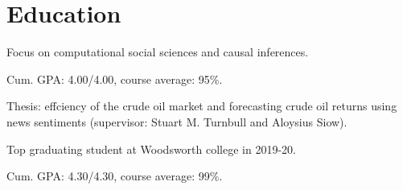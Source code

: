 \documentclass[letterpaper]{deedy-resume} %
\begin{document}
\begin{minipage}[t]{0.66\textwidth} %


\section{Education}


\vspace{\topsep} %
\begin{tightitemize}
\item Focus on computational social sciences and causal inferences.
\end{tightitemize}

\sectionspace %



\begin{tightitemize}
\item Cum. GPA: 4.00/4.00, course average: 95\%.
\item Thesis: effciency of the crude oil market and forecasting crude oil returns using news sentiments (supervisor: Stuart M. Turnbull and Aloysius Siow).
\item Top graduating student at Woodsworth college in 2019-20.
\end{tightitemize}

\sectionspace %



\begin{tightitemize}
\item Cum. GPA: 4.30/4.30, course average: 99\%.
\end{tightitemize}


\end{minipage}
\end{document}
